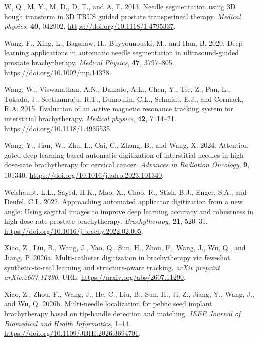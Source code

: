 \documentclass[
  11pt,
]{article}
\newlength{\cslhangindent}
\newenvironment{CSLReferences}[2] %
 {\begin{list}{}{%
  \setlength{\itemindent}{0pt}
  \setlength{\leftmargin}{0pt}
  \setlength{\parsep}{0pt}
  \ifodd #1
   \setlength{\leftmargin}{\cslhangindent}
   \setlength{\itemindent}{-1\cslhangindent}
  \fi
  \setlength{\itemsep}{#2\baselineskip}}}
 {\end{list}}
\begin{document}
\begin{CSLReferences}{1}{1}
W, Q., M, Y., M, D., D, T., and A, F. 2013. Needle segmentation using 3D
hough transform in 3D TRUS guided prostate transperineal therapy.
\emph{Medical physics}, \textbf{40}, 042902.
\url{https://doi.org/10.1118/1.4795337}.

Wang, F., Xing, L., Bagshaw, H., Buyyounouski, M., and Han, B. 2020.
Deep learning applications in automatic needle segmentation in
ultrasound-guided prostate brachytherapy. \emph{Medical Physics},
\textbf{47}, 3797--805. \url{https://doi.org/10.1002/mp.14328}.

Wang, W., Viswanathan, A.N., Damato, A.L., Chen, Y., Tse, Z., Pan, L.,
Tokuda, J., Seethamraju, R.T., Dumoulin, C.L., Schmidt, E.J., and
Cormack, R.A. 2015. Evaluation of an active magnetic resonance tracking
system for interstitial brachytherapy. \emph{Medical physics},
\textbf{42}, 7114--21. \url{https://doi.org/10.1118/1.4935535}.

Wang, Y., Jian, W., Zhu, L., Cai, C., Zhang, B., and Wang, X. 2024.
Attention-gated deep-learning-based automatic digitization of
interstitial needles in high-dose-rate brachytherapy for cervical
cancer. \emph{Advances in Radiation Oncology}, \textbf{9}, 101340.
\url{https://doi.org/10.1016/j.adro.2023.101340}.

Weishaupt, L.L., Sayed, H.K., Mao, X., Choo, R., Stish, B.J., Enger,
S.A., and Deufel, C.L. 2022. Approaching automated applicator
digitization from a new angle: Using sagittal images to improve deep
learning accuracy and robustness in high-dose-rate prostate
brachytherapy. \emph{Brachytherapy}, \textbf{21}, 520--31.
\url{https://doi.org/10.1016/j.brachy.2022.02.005}.

Xiao, Z., Liu, B., Wang, J., Yao, Q., Sun, H., Zhou, F., Wang, J., Wu,
Q., and Jiang, P. 2026a. Multi-catheter digitization in brachytherapy
via few-shot synthetic-to-real learning and structure-aware tracking.
\emph{arXiv preprint arXiv:2607.11290}. URL:
\url{https://arxiv.org/abs/2607.11290}.

Xiao, Z., Zhou, F., Wang, J., He, C., Liu, B., Sun, H., Ji, Z., Jiang,
Y., Wang, J., and Wu, Q. 2026b. Multi-needle localization for pelvic
seed implant brachytherapy based on tip-handle detection and matching.
\emph{IEEE Journal of Biomedical and Health Informatics}, 1--14.
\url{https://doi.org/10.1109/JBHI.2026.3694701}.


\end{CSLReferences}
\end{document}

